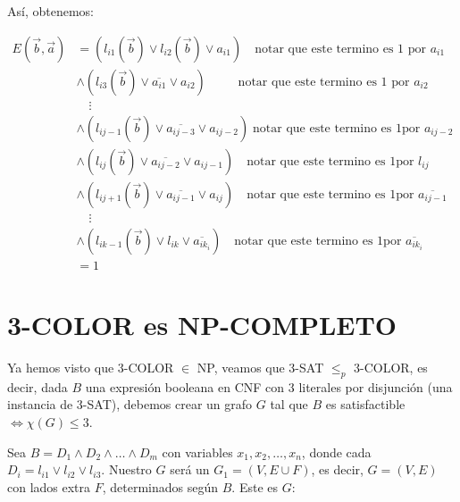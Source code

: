 \documentclass[10pt,a4paper]{article}
\begin{document}
Así, obtenemos:

\begin{center}
\begin{align*} E(\overrightarrow{b},\overrightarrow{a}) &= (l_{i1}(\overrightarrow{b} ) \lor l_{i2}(\overrightarrow{b})\lor a_{i1}) \quad \text{notar que este termino es 1 por } a_{i1}\\ &\land(l_{i3}(\overrightarrow{b} ) \lor \overline{a_{i1}}\lor a_{i2}) \quad \quad \;\;\text{notar que este termino es 1 por } a_{i2}\\ &\quad \vdots \\ &\land(l_{ij-1}(\overrightarrow{b} ) \lor \overline{a_{ij-3}}\lor a_{ij-2}) \;\text{notar que este termino es 1por } a_{ij-2}\\ &\land(l_{ij}(\overrightarrow{b} ) \lor \overline{a_{ij-2}}\lor a_{ij-1}) \quad \text{notar que este termino es 1por } l_{ij}\\ &\land(l_{ij+1}(\overrightarrow{b} ) \lor \overline{a_{ij-1}}\lor a_{ij}) \quad \text{notar que este termino es 1por } \overline{a_{ij-1}}\\ &\quad \vdots\\ &\land(l_{ik-1}(\overrightarrow{b} ) \lor l_{ik}\lor \overline{a_{ik_i}}) \quad \text{notar que este termino es 1por } \overline{a_{ik_i}}\\ &= 1 \end{align*}
\end{center}

\section*{3-COLOR es NP-COMPLETO}

Ya hemos visto que 3-COLOR $\in $ NP, veamos que 3-SAT $\leq_p $ 3-COLOR, es decir, dada $B$ una expresión booleana en CNF con 3 literales por disjunción (una instancia de 3-SAT), debemos crear un grafo $G$ tal que $B $ es satisfactible $\Leftrightarrow \chi(G) \leq 3$.

Sea $B = D_1 \land D_2 \land \dots \land D_m$ con variables $x_1, x_2, \dots, x_n$, donde cada $D_i = l_{i1}\lor l_{i2} \lor l_{i3}$. Nuestro $G$ será un $G_1 = (V, E \cup F)$, es decir, $G =(V, E)$ con lados extra $F$, determinados según $B$. Este es $G$:
\end{document}
